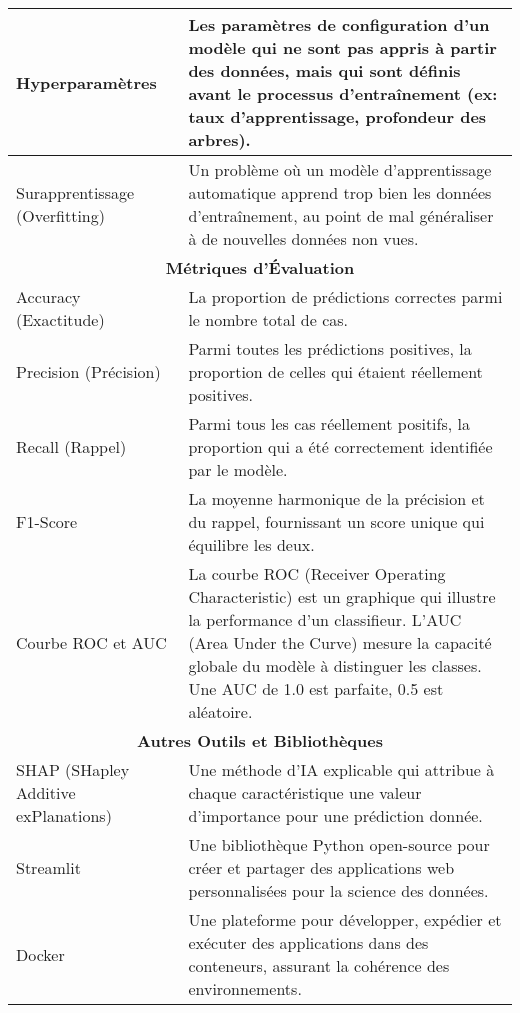 \begin{longtable}{p{} p{}}
\midrule
Hyperparamètres & Les paramètres de configuration d'un modèle qui ne sont pas appris à partir des données, mais qui sont définis avant le processus d'entraînement (ex: taux d'apprentissage, profondeur des arbres). \\
\midrule
Surapprentissage (Overfitting) & Un problème où un modèle d'apprentissage automatique apprend trop bien les données d'entraînement, au point de mal généraliser à de nouvelles données non vues. \\
\midrule
\multicolumn{2}{c}{\textbf{Métriques d'Évaluation}} \\
\midrule
Accuracy (Exactitude) & La proportion de prédictions correctes parmi le nombre total de cas. \\
\midrule
Precision (Précision) & Parmi toutes les prédictions positives, la proportion de celles qui étaient réellement positives. \\
\midrule
Recall (Rappel) & Parmi tous les cas réellement positifs, la proportion qui a été correctement identifiée par le modèle. \\
\midrule
F1-Score & La moyenne harmonique de la précision et du rappel, fournissant un score unique qui équilibre les deux. \\
\midrule
Courbe ROC et AUC & La courbe ROC (Receiver Operating Characteristic) est un graphique qui illustre la performance d'un classifieur. L'AUC (Area Under the Curve) mesure la capacité globale du modèle à distinguer les classes. Une AUC de 1.0 est parfaite, 0.5 est aléatoire. \\
\midrule
\multicolumn{2}{c}{\textbf{Autres Outils et Bibliothèques}} \\
\midrule
SHAP (SHapley Additive exPlanations) & Une méthode d'IA explicable qui attribue à chaque caractéristique une valeur d'importance pour une prédiction donnée. \\
\midrule
Streamlit & Une bibliothèque Python open-source pour créer et partager des applications web personnalisées pour la science des données. \\
\midrule
Docker & Une plateforme pour développer, expédier et exécuter des applications dans des conteneurs, assurant la cohérence des environnements. \\

\end{longtable}
